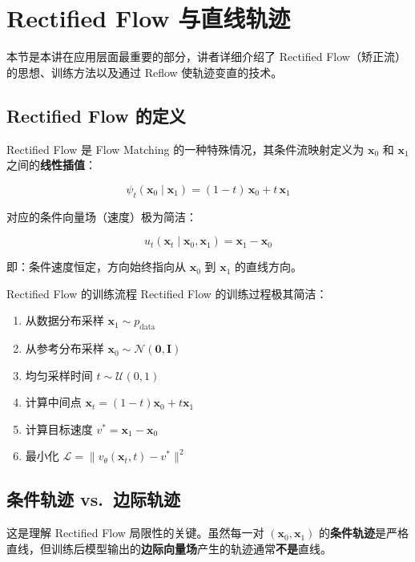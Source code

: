 \section{Rectified Flow 与直线轨迹}

本节是本讲在应用层面最重要的部分，讲者详细介绍了 Rectified Flow（矫正流）的思想、训练方法以及通过 Reflow 使轨迹变直的技术。

\subsection{Rectified Flow 的定义}

Rectified Flow 是 Flow Matching 的一种特殊情况，其条件流映射定义为 $\mathbf{x}_0$ 和 $\mathbf{x}_1$ 之间的\textbf{线性插值}：

$$\psi_t(\mathbf{x}_0 \mid \mathbf{x}_1) = (1 - t)\, \mathbf{x}_0 + t\, \mathbf{x}_1$$

对应的条件向量场（速度）极为简洁：

$$u_t(\mathbf{x}_t \mid \mathbf{x}_0, \mathbf{x}_1) = \mathbf{x}_1 - \mathbf{x}_0$$

即：条件速度恒定，方向始终指向从 $\mathbf{x}_0$ 到 $\mathbf{x}_1$ 的直线方向。

\begin{importantbox}{Rectified Flow 的训练流程}
Rectified Flow 的训练过程极其简洁：
\begin{enumerate}
    \item 从数据分布采样 $\mathbf{x}_1 \sim p_{\text{data}}$
    \item 从参考分布采样 $\mathbf{x}_0 \sim \mathcal{N}(\mathbf{0}, \mathbf{I})$
    \item 均匀采样时间 $t \sim \mathcal{U}(0, 1)$
    \item 计算中间点 $\mathbf{x}_t = (1-t)\mathbf{x}_0 + t\mathbf{x}_1$
    \item 计算目标速度 $v^* = \mathbf{x}_1 - \mathbf{x}_0$
    \item 最小化 $\mathcal{L} = \| v_\theta(\mathbf{x}_t, t) - v^* \|^2$
\end{enumerate}
\end{importantbox}

\subsection{条件轨迹 vs.\ 边际轨迹}

这是理解 Rectified Flow 局限性的关键。虽然每一对 $(\mathbf{x}_0, \mathbf{x}_1)$ 的\textbf{条件轨迹}是严格直线，但训练后模型输出的\textbf{边际向量场}产生的轨迹通常\textbf{不是}直线。

